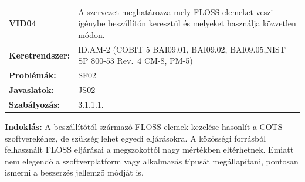 \documentclass[12pt,magyar,a4paper,oneside]{scrreprt}
\begin{document}
\begin{longtable}[]{@{}ll@{}}
\toprule
\endhead
\begin{minipage}[t]{0.16\columnwidth}\raggedright
\textbf{VID04}\strut
\end{minipage} & \begin{minipage}[t]{0.79\columnwidth}\raggedright
A szervezet meghatározza mely FLOSS elemeket veszi igénybe beszállítón
keresztül és melyeket használja közvetlen módon.\strut
\end{minipage}\tabularnewline
\begin{minipage}[t]{0.16\columnwidth}\raggedright
\textbf{Keretrendszer:}\strut
\end{minipage} & \begin{minipage}[t]{0.79\columnwidth}\raggedright
ID.AM-2 (COBIT 5 BAI09.01, BAI09.02, BAI09.05,NIST SP 800-53 Rev.~4
CM-8, PM-5)\strut
\end{minipage}\tabularnewline
\begin{minipage}[t]{0.16\columnwidth}\raggedright
\textbf{Problémák:}\strut
\end{minipage} & \begin{minipage}[t]{0.79\columnwidth}\raggedright
SF02\strut
\end{minipage}\tabularnewline
\begin{minipage}[t]{0.16\columnwidth}\raggedright
\textbf{Javaslatok:}\strut
\end{minipage} & \begin{minipage}[t]{0.79\columnwidth}\raggedright
JS02\strut
\end{minipage}\tabularnewline
\begin{minipage}[t]{0.16\columnwidth}\raggedright
\textbf{Szabályozás:}\strut
\end{minipage} & \begin{minipage}[t]{0.79\columnwidth}\raggedright
3.1.1.1.\strut
\end{minipage}\tabularnewline
\bottomrule
\end{longtable}

\textbf{Indoklás: } A beszállítótól származó FLOSS elemek kezelése
hasonlít a COTS szoftverekéhez, de szükség lehet egyedi eljárásokra. A
közösségi forrásból felhasznált FLOSS eljárásai a megszokottól nagy
mértékben eltérhetnek. Emiatt nem elegendő a szoftverplatform vagy
alkalmazás típusát megállapítani, pontosan ismerni a beszerzés jellemző
módját is.
\end{document}
